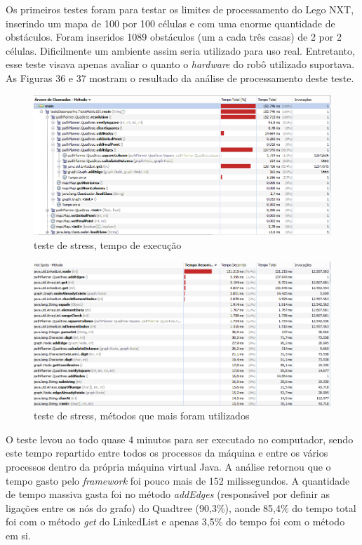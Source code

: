 Os primeiros testes foram para testar os limites de processamento do Lego NXT, inserindo um mapa de 100 por 100 células e com uma enorme quantidade de obstáculos. Foram inseridos 1089 obstáculos (um a cada três casas) de 2 por 2 células. Dificilmente um ambiente assim seria utilizado para uso real. Entretanto, esse teste visava apenas avaliar o quanto o \textit{hardware} do robô utilizado suportava. As Figuras 36 e 37 mostram o resultado da análise de processamento deste teste.

\begin{figure}[h]
	\centering
	\label{fig36}
		\includegraphics[keepaspectratio=true,scale=0.6]{figuras/teste100_1.PNG}
	\caption{teste de stress, tempo de execução}
\end{figure}

\begin{figure}[h]
	\centering
	\label{fig37}
		\includegraphics[keepaspectratio=true,scale=0.6]{figuras/teste100_2.PNG}
	\caption{teste de stress, métodos que mais foram utilizados}
\end{figure}

O teste levou ao todo quase 4 minutos para ser executado no computador, sendo este tempo repartido entre todos os processos da máquina e entre os vários processos dentro da própria máquina virtual Java. A análise retornou que o tempo gasto pelo \textit{framework} foi pouco mais de 152 milissegundos. A quantidade de tempo massiva gasta foi no método \textit{addEdges} (responsável por definir as ligações entre os nós do grafo) do Quadtree (90,3\%), aonde 85,4\% do tempo total foi com o método \textit{get} do LinkedList e apenas 3,5\% do tempo foi com o método em si.

